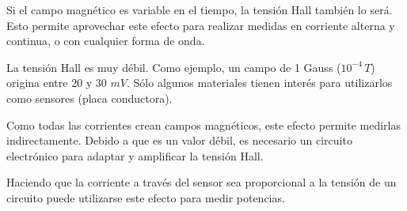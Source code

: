 				
				Si el campo magnético es variable en el tiempo, la
				tensión Hall también lo será. Esto permite aprovechar este efecto para realizar medidas en corriente alterna y continua, o con cualquier forma de onda.
				
				
				La tensión Hall es muy débil. Como ejemplo, un campo
				de 1 Gauss ($10^{-4}\,T$) origina entre 20 y 30 $mV$. Sólo algunos materiales tienen interés para utilizarlos
				como sensores (placa conductora).
				
				
				Como todas las corrientes crean campos magnéticos, este
				efecto permite medirlas indirectamente. Debido a que es un valor débil, es necesario un circuito electrónico para adaptar y
				amplificar la tensión Hall.
				
				Haciendo que la corriente a través del sensor sea
				proporcional a la tensión de un circuito puede utilizarse
				este efecto para medir potencias.
				
		
